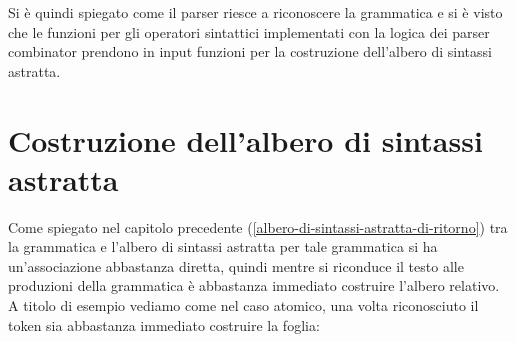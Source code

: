 \documentclass[12pt,a4paper]{report}
\begin{document}
\begin{Shaded}
\begin{Highlighting}[]
 
\NormalTok{ choice_list [}
\NormalTok{) }\NormalTok{ ;}
\NormalTok{;}
\NormalTok{ ] s}
\NormalTok{ (} 
\NormalTok{ choice_list [}
\NormalTok{) (}
\NormalTok{) (}
\NormalTok{) (}
\NormalTok{ ] s}
\end{Highlighting}
\end{Shaded}

Si è quindi spiegato come il parser riesce a riconoscere la grammatica e
si è visto che le funzioni per gli operatori sintattici implementati con
la logica dei parser combinator prendono in input funzioni per la
costruzione dell'albero di sintassi astratta.

\hypertarget{costruzione-dellalbero-di-sintassi-astratta}{%
\section{Costruzione dell'albero di sintassi
astratta}\label{costruzione-dellalbero-di-sintassi-astratta}}

Come spiegato nel capitolo precedente
(\ref{albero-di-sintassi-astratta-di-ritorno}) tra la grammatica e
l'albero di sintassi astratta per tale grammatica si ha un'associazione
abbastanza diretta, quindi mentre si riconduce il testo alle produzioni
della grammatica è abbastanza immediato costruire l'albero relativo. A
titolo di esempio vediamo come nel caso atomico, una volta riconosciuto
il token sia abbastanza immediato costruire la foglia:
\end{document}
